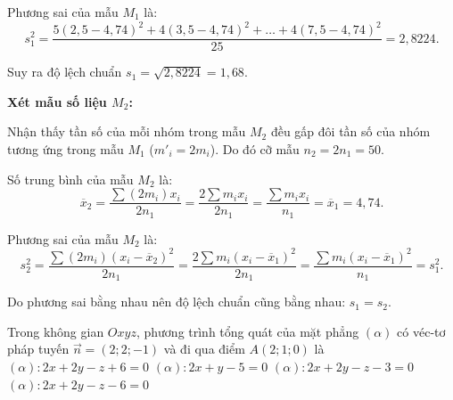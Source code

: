 \begin{ex}
{		Phương sai của mẫu $M_1$ là:
		$$ s_1^2 = \frac{5(2{,}5 - 4{,}74)^2 + 4(3{,}5 - 4{,}74)^2 + \ldots + 4(7{,}5 - 4{,}74)^2}{25} = 2{,}8224. $$
		
		Suy ra độ lệch chuẩn $s_1 = \sqrt{2{,}8224} = 1{,}68$.
		
		\textbf{Xét mẫu số liệu $M_2$:}
		
		Nhận thấy tần số của mỗi nhóm trong mẫu $M_2$ đều gấp đôi tần số của nhóm tương ứng trong mẫu $M_1$ ($m'_i = 2m_i$). Do đó cỡ mẫu $n_2 = 2n_1 = 50$.
		
		Số trung bình của mẫu $M_2$ là:
		$$ \overline{x}_2 = \frac{\sum (2m_i)x_i}{2n_1} = \frac{2\sum m_i x_i}{2n_1} = \frac{\sum m_i x_i}{n_1} = \overline{x}_1 = 4{,}74. $$
		
		Phương sai của mẫu $M_2$ là:
		$$ s_2^2 = \frac{\sum (2m_i)(x_i - \overline{x}_2)^2}{2n_1} = \frac{2\sum m_i(x_i - \overline{x}_1)^2}{2n_1} = \frac{\sum m_i(x_i - \overline{x}_1)^2}{n_1} = s_1^2. $$
		
		Do phương sai bằng nhau nên độ lệch chuẩn cũng bằng nhau: $s_1 = s_2$.
	}
\end{ex}

\begin{ex}%
	Trong không gian $Oxyz$, phương trình tổng quát của mặt phẳng $(\alpha)$ có véc-tơ pháp tuyến $\overrightarrow{n}=(2;2;-1)$ và đi qua điểm $A(2;1;0)$ là
	\choice
	{$(\alpha)\colon 2x+2y-z+6=0$}
	{$(\alpha)\colon 2x+y-5=0$}
	{$(\alpha)\colon 2x+2y-z-3=0$}
	{\True $(\alpha)\colon 2x+2y-z-6=0$}
\end{ex}


